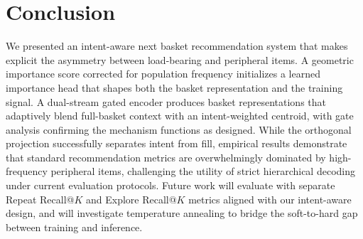 \documentclass[conference]{IEEEtran}
\begin{document}
\section{Conclusion}
\label{sec:conclusion}
We presented an intent-aware next basket recommendation system that makes explicit the asymmetry between load-bearing and peripheral items. A geometric importance score corrected for population frequency initializes a learned importance head that shapes both the basket representation and the training signal. A dual-stream gated encoder produces basket representations that adaptively blend full-basket context with an intent-weighted centroid, with gate analysis confirming the mechanism functions as designed. While the orthogonal projection successfully separates intent from fill, empirical results demonstrate that standard recommendation metrics are overwhelmingly dominated by high-frequency peripheral items, challenging the utility of strict hierarchical decoding under current evaluation protocols. Future work will evaluate with separate Repeat Recall@$K$ and Explore Recall@$K$ metrics aligned with our intent-aware design, and will investigate temperature annealing to bridge the soft-to-hard gap between training and inference.



\end{document}
